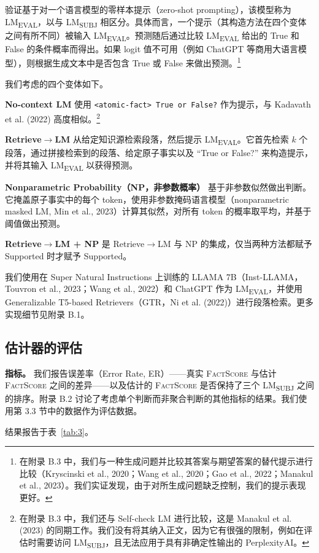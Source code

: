 \documentclass[11pt,UTF8,fontset=fandol]{ctexart}
\newcommand{\FS}{\textsc{FactScore}}
\newcommand{\subj}{LM\textsubscript{SUBJ}}
\newcommand{\eval}{LM\textsubscript{EVAL}}
\begin{document}
验证基于对一个语言模型的零样本提示（zero-shot prompting），该模型称为 \eval，以与 \subj{} 相区分。具体而言，一个提示（其构造方法在四个变体之间有所不同）被输入 \eval。预测随后通过比较 \eval{} 给出的 True 和 False 的条件概率而得出。如果 logit 值不可用（例如 ChatGPT 等商用大语言模型），则根据生成文本中是否包含 True 或 False 来做出预测。\footnote{在附录 B.3 中，我们与一种生成问题并比较其答案与期望答案的替代提示进行比较（Kryscinski et al., 2020；Wang et al., 2020；Gao et al., 2022；Manakul et al., 2023）。我们实证发现，由于对所生成问题缺乏控制，我们的提示表现更好。}

我们考虑的四个变体如下。

\textbf{No-context LM} 使用 \texttt{<atomic-fact> True or False?} 作为提示，与 Kadavath et al. (2022) 高度相似。\footnote{在附录 B.3 中，我们还与 Self-check LM 进行比较，这是 Manakul et al. (2023) 的同期工作。我们没有将其纳入正文，因为它有很强的限制，例如在评估时需要访问 \subj，且无法应用于具有非确定性输出的 PerplexityAI。}

\textbf{Retrieve$\rightarrow$LM} 从给定知识源检索段落，然后提示 \eval。它首先检索 $k$ 个段落，通过拼接检索到的段落、给定原子事实以及 “True or False?” 来构造提示，并将其输入 \eval{} 以获得预测。

\textbf{Nonparametric Probability（NP，非参数概率）} 基于非参数似然做出判断。它掩盖原子事实中的每个 token，使用非参数掩码语言模型（nonparametric masked LM, Min et al., 2023）计算其似然，对所有 token 的概率取平均，并基于阈值做出预测。

\textbf{Retrieve$\rightarrow$LM + NP} 是 Retrieve$\rightarrow$LM 与 NP 的集成，仅当两种方法都赋予 Supported 时才赋予 Supported。

我们使用在 Super Natural Instructions 上训练的 LLAMA 7B（Inst-LLAMA，Touvron et al., 2023；Wang et al., 2022）和 ChatGPT 作为 \eval，并使用 Generalizable T5-based Retrievers（GTR，Ni et al. (2022)）进行段落检索。更多实现细节见附录 B.1。

\subsection{估计器的评估}

\textbf{指标。} 我们报告误差率（Error Rate, ER）——真实 \FS{} 与估计 \FS{} 之间的差异——以及估计的 \FS{} 是否保持了三个 \subj{} 之间的排序。附录 B.2 讨论了考虑单个判断而非聚合判断的其他指标的结果。我们使用第 3.3 节中的数据作为评估数据。

结果报告于表~\ref{tab:3}。
\end{document}
